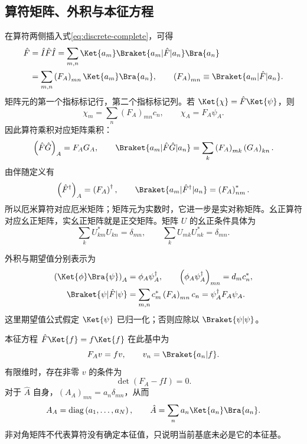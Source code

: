 \subsection{算符矩阵、外积与本征方程}
在算符两侧插入式\eqref{eq:discrete-complete}，可得
\begin{align}
\hat F&=\hat I\hat F\hat I
=\sum_{m,n}\Ket{a_m}\Braket{a_m|\hat F|a_n}\Bra{a_n}\\
&=\sum_{m,n}\left(F_A\right)_{mn}\Ket{a_m}\Bra{a_n},\qquad
\left(F_A\right)_{mn}\equiv\Braket{a_m|\hat F|a_n}.
\label{eq:matrix-outer}
\end{align}
矩阵元的第一个指标标记行，第二个指标标记列。若 $\Ket{\chi}=\hat F\Ket{\psi}$，则
\begin{equation}
\chi_m=\sum_n\left(F_A\right)_{mn}c_n,\qquad \chi_A=F_A\psi_A.
\end{equation}
因此算符乘积对应矩阵乘积：
\begin{equation}
\left(\hat F\hat G\right)_A=F_AG_A,\qquad
\Braket{a_m|\hat F\hat G|a_n}=\sum_k\left(F_A\right)_{mk}\left(G_A\right)_{kn}.
\end{equation}
由伴随定义有
\begin{equation}
\left(\hat F^\dagger\right)_A=\left(F_A\right)^\dagger,\qquad
\Braket{a_m|\hat F^\dagger|a_n}=\left(F_A\right)_{nm}^*.
\end{equation}
所以厄米算符对应厄米矩阵；矩阵元为实数时，它进一步是实对称矩阵。幺正算符对应幺正矩阵，实幺正矩阵就是正交矩阵。矩阵 $U$ 的幺正条件具体为
\begin{equation}
\sum_k U_{km}^*U_{kn}=\delta_{mn},\qquad
\sum_k U_{mk}U_{nk}^*=\delta_{mn}.
\end{equation}

外积与期望值分别表示为
\begin{align}
\left(\Ket{\phi}\Bra{\psi}\right)_A&=\phi_A\psi_A^\dagger,
\qquad \left(\phi_A\psi_A^\dagger\right)_{mn}=d_mc_n^*,\\
\Braket{\psi|\hat F|\psi}&=\sum_{m,n}c_m^*\left(F_A\right)_{mn}c_n
=\psi_A^\dagger F_A\psi_A.
\end{align}
这里期望值公式假定 $\Ket{\psi}$ 已归一化；否则应除以 $\Braket{\psi|\psi}$。

本征方程 $\hat F\Ket{f}=f\Ket{f}$ 在此基中为
\begin{equation}
F_Av=fv,\qquad v_n=\Braket{a_n|f}.
\end{equation}
有限维时，存在非零 $v$ 的条件为
\begin{equation}
\det\left(F_A-fI\right)=0.
\end{equation}
对于 $\hat A$ 自身，$\left(A_A\right)_{mn}=a_n\delta_{mn}$，从而
\begin{equation}
A_A=\operatorname{diag}\left(a_1,\ldots,a_N\right),\qquad
\hat A=\sum_n a_n\Ket{a_n}\Bra{a_n}.
\end{equation}
非对角矩阵不代表算符没有确定本征值，只说明当前基底未必是它的本征基。

